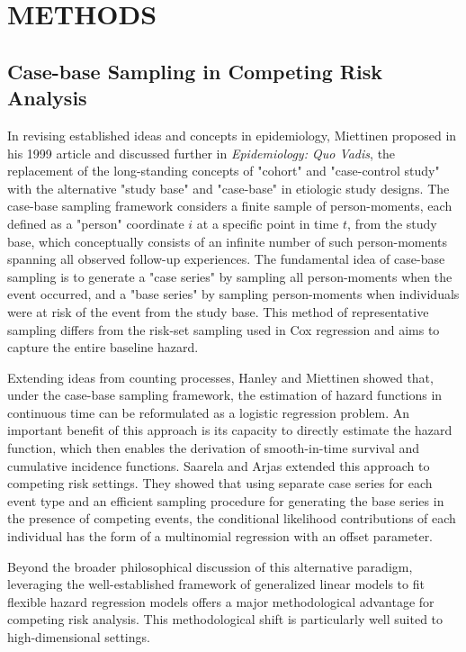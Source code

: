 \documentclass[AMA,Times1COL]{WileyNJDv5} %
\begin{document}
\section{METHODS}\label{sec2}

\subsection{Case-base Sampling in Competing Risk Analysis}

In revising established ideas and concepts in epidemiology, Miettinen proposed in his 1999 article\cite{Miettinen:1999} and discussed further in \textit{Epidemiology: Quo Vadis},\cite{Miettinen:2004} the replacement of the long-standing concepts of "cohort" and "case-control study" with the alternative "study base" and "case-base" in etiologic study designs. The case-base sampling framework considers a finite sample of person-moments, each defined as a "person" coordinate $i$ at a specific point in time $t$, from the study base, which conceptually consists of an infinite number of such person-moments spanning all observed follow-up experiences. The fundamental idea of case-base sampling is to generate a "case series" by sampling all person-moments when the event occurred, and a "base series" by sampling person-moments when individuals were at risk of the event from the study base.\citep{HanleyMiettinen:2009} This method of representative sampling differs from the risk-set sampling used in Cox regression and aims to capture the entire baseline hazard. 

Extending ideas from counting processes, Hanley and Miettinen showed that, under the case-base sampling framework, the estimation of hazard functions in continuous time can be reformulated as a logistic regression problem.\cite{HanleyMiettinen:2009} An important benefit of this approach is its capacity to directly estimate the hazard function, which then enables the derivation of smooth-in-time survival and cumulative incidence functions. Saarela and Arjas extended this approach to competing risk settings.\cite{SaarelaArjas:2015} They showed that using separate case series for each event type and an efficient sampling procedure for generating the base series in the presence of competing events, the conditional likelihood contributions of each individual has the form of a multinomial regression with an offset parameter.

Beyond the broader philosophical discussion of this alternative paradigm, leveraging the well-established framework of generalized linear models to fit flexible hazard regression models offers a major methodological advantage for competing risk analysis. This methodological shift is particularly well suited to high-dimensional settings.\cite{BhatnagarTurgeonIslam:2022} 
\end{document}
